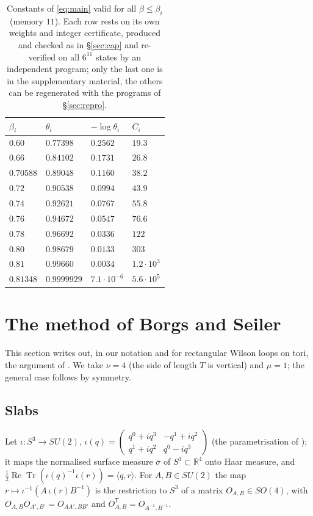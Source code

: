 \documentclass[11pt,a4paper]{article}
\theoremstyle{plain}
\theoremstyle{remark}
\numberwithin{equation}{section}
\newcommand{\R}{\mathbb{R}}
\newcommand{\ReTr}{\operatorname{Re}\operatorname{Tr}}
\begin{document}
\begin{table}[ht]
\centering\small
\begin{tabular}{@{}llll@{}}
\toprule
$\beta_i$ & $\theta_i$ & $-\log\theta_i$ & $C_i$\\
\midrule
$0.60$ & $0.77398$ & $0.2562$ & $19.3$\\
$0.66$ & $0.84102$ & $0.1731$ & $26.8$\\
$0.70588$ & $0.89048$ & $0.1160$ & $38.2$\\
$0.72$ & $0.90538$ & $0.0994$ & $43.9$\\
$0.74$ & $0.92621$ & $0.0767$ & $55.8$\\
$0.76$ & $0.94672$ & $0.0547$ & $76.6$\\
$0.78$ & $0.96692$ & $0.0336$ & $122$\\
$0.80$ & $0.98679$ & $0.0133$ & $303$\\
$0.81$ & $0.99660$ & $0.0034$ & $1.2\cdot10^{3}$\\
$0.81348$ & $0.9999929$ & $7.1\cdot10^{-6}$ & $5.6\cdot10^{5}$\\
\bottomrule
\end{tabular}
\caption{Constants of \eqref{eq:main} valid for all $\beta\le\beta_i$ (memory $11$). Each row rests on its own weights and integer
certificate, produced and checked as in \S\ref{sec:cap} and re-verified on all $6^{11}$ states by an independent program; only the
last one is in the supplementary material, the others can be regenerated with the programs of \S\ref{sec:repro}.}
\label{tab:tension}
\end{table}

\section{The method of Borgs and Seiler}\label{sec:bs}

This section writes out, in our notation and for rectangular Wilson loops on tori, the argument of \cite[Appendix~B]{BS83}. We take
$\nu=4$ (the side of length $T$ is vertical) and $\mu=1$; the general case follows by symmetry.

\subsection{Slabs}
Let $\iota:S^3\to SU(2)$, $\iota(q)=\begin{pmatrix}q^0+iq^3&-q^1+iq^2\\ q^1+iq^2&q^0-iq^3\end{pmatrix}$ (the parametrisation of
\cite[(5.1)]{DF80}); it maps the normalised surface measure $\bar\sigma$ of $S^3\subset\R^4$ onto Haar measure, and
$\frac12\ReTr(\iota(q)^{-1}\iota(r))=\langle q,r\rangle$. For $A,B\in SU(2)$ the map $r\mapsto\iota^{-1}(A\,\iota(r)B^{-1})$ is the
restriction to $S^3$ of a matrix $O_{A,B}\in SO(4)$, with $O_{A,B}O_{A',B'}=O_{AA',BB'}$ and $O_{A,B}^{\mathsf T}=O_{A^{-1},B^{-1}}$.
\end{document}
